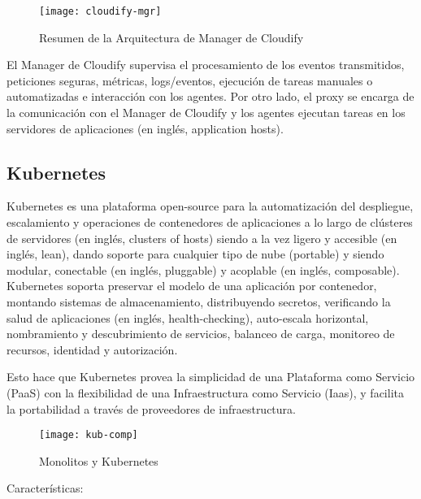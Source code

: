 \begin{figure}[H]
    \centering
    \texttt{[image: cloudify-mgr]}
    \caption{Resumen de la Arquitectura de  Manager de Cloudify \protect\cite{Cloudify2016-ze}}
    \label{fig:cloudify-mgr}
\end{figure}

El Manager de Cloudify supervisa el procesamiento de los eventos transmitidos, peticiones seguras, métricas, logs/eventos, ejecución de tareas manuales o automatizadas e interacción con los agentes. Por otro lado, el proxy se encarga de la comunicación con el Manager de Cloudify y los agentes ejecutan tareas en los servidores de aplicaciones (en inglés, application hosts).


\subsection{Kubernetes}

Kubernetes es una plataforma open-source para la automatización del despliegue, escalamiento y  operaciones de contenedores de aplicaciones a lo largo de clústeres de servidores (en inglés, clusters of hosts) siendo a la vez ligero y accesible (en inglés, lean), dando soporte para cualquier tipo de nube (portable) y siendo modular, conectable (en inglés, pluggable) y acoplable (en inglés, composable).
Kubernetes soporta preservar el modelo de una aplicación por contenedor, montando sistemas de almacenamiento, distribuyendo secretos, verificando la salud de aplicaciones (en inglés, health-checking), auto-escala horizontal, nombramiento y descubrimiento de servicios, balanceo de carga, monitoreo de recursos, identidad y autorización.

Esto hace que Kubernetes provea la simplicidad de una Plataforma como Servicio (PaaS) con la flexibilidad de una Infraestructura como Servicio (Iaas), y facilita la portabilidad a través de proveedores de infraestructura.

\begin{figure}[H]
    \centering
    \texttt{[image: kub-comp]}
    \caption{ Monolitos y Kubernetes \protect\cite{Kubernetes2016-li}}
    \label{fig:kub-comp}
\end{figure}

Características:
 
